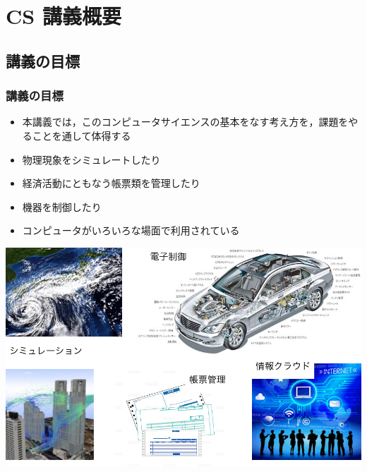 \section{CS 講義概要}
%
%
\subsection{講義の目標}
\begin{frame}
\frametitle{講義の目標}
  \begin{itemize}
\item 本講義では，このコンピュータサイエンスの基本をなす考え方を，課題をやることを通して体得する
\item 物理現象をシミュレートしたり
\item 経済活動にともなう帳票類を管理したり
\item 機器を制御したり
\item コンピュータがいろいろな場面で利用されている
  \end{itemize}
\centering
\includegraphics[scale=.35]{./Figure/elementaryCS-1st-FigComputer.pdf}
\end{frame}
